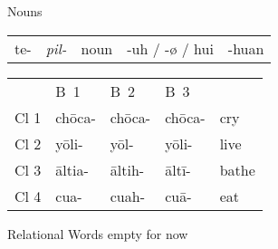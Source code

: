 \documentclass[12pt]{beamer}
\newcommand{\nah}[1]{\textcolor{nahgrn}{#1}}
\newcommand{\trs}[1]{\textcolor{nahblu}{#1}}
\begin{document}
\begin{frame}
\begin{columns}[t]
\begin{column}{.23\linewidth}
\begin{block}{Nouns}
\begin{enumerate}
\begin{tabular}[t]{lcccc}
				\nah{te-} 	& \textit{pil-} & noun & \trs{-uh} / \trs{-ø} / \trs{hui} & \trs{-huan}\\
			\end{tabular}%
			\begin{example}
				\begin{tabular}{lllll}
					& B~1          & B~2          & B~3          &             \\
					Cl 1 & \nah{chōca-} & \nah{chōca-} & \nah{chōca-} & \trs{cry}   \\
					Cl 2 & \nah{yōli-}  & \nah{yōl-}   & \nah{yōli-}  & \trs{live}  \\
					Cl 3 & \nah{āltia-} & \nah{āltih-} & \nah{āltī-}  & \trs{bathe} \\
					Cl 4 & \nah{cua-}   & \nah{cuah-}  & \nah{cuā-}   & \trs{eat}
				\end{tabular}
			\end{example}
        \end{enumerate}
      \end{block}
	  \begin{block}{Relational Words} %
	  	empty for now
	  \end{block}
    \end{column}


\end{columns}
\end{frame}
\end{document}
